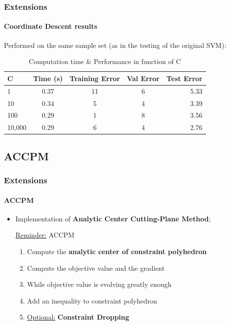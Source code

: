 \documentclass{beamer}
\begin{document}
\begin{frame}
\frametitle{Extensions}
\framesubtitle{Coordinate Descent results}

Performed on the same sample set (as in the testing of the original SVM):\\

                \begin{table}
                \centering
                \caption{Computation time \& Performance in function of C}
                \begin{tabular}{| l | c | c | c | r |}
                \hline
               C  & Time (s) & Training Error & Val Error & Test Error\\ \hline
               1 & 0.37 & 11 & 6 & 5.33\\ \hline
               10  & 0.34 & 5 & 4 & 3.39\\ \hline
               100  & 0.29 & 1 & 8 & 3.56 \\ \hline
               10,000 & 0.29 & 6 & 4 & 2.76\\ \hline
                \end{tabular}
                \end{table}

\end{frame}

\subsection{ACCPM}

\begin{frame}
\tableofcontents[currentsubsection]
\end{frame}

\begin{frame}
\frametitle{Extensions}
\framesubtitle{ACCPM}

\begin{itemize}

\item Implementation of \textbf{Analytic Center Cutting-Plane Method};

\bigskip
\pause

\begin{block}{\underline{Reminder:} ACCPM}
\begin{enumerate}
\item Compute the \textbf{analytic center of constraint polyhedron} 
\item Compute the objective value and the gradient 
\item While objective value is evolving greatly enough
\item Add an inequality to constraint polyhedron 
\item \underline{Optional:} \textbf{Constraint Dropping}
\end{enumerate}
\end{block}

\end{itemize}

\end{frame}
\end{document}
